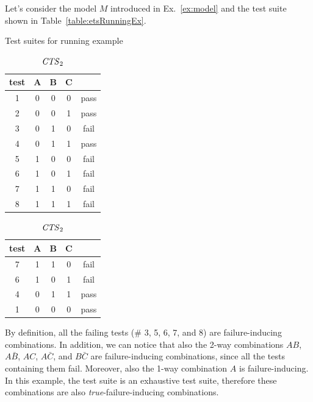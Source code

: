\begin{tikzborder}{\cite{Gargantini16:validation}}
\begin{tikzborder}{\cite{gargantini_combinatorial_2017}}
\begin{tikzborder}{\cite{garn2019}}
\begin{tikzborder}{\cite{arcaini2019achieving}}
\begin{example}\label{ex:fic}
\begin{tikzborder}{}
		Let's consider the model $M$ introduced in Ex.~\ref{ex:model} and the test suite shown in Table~\ref{table:etsRunningEx}.
\end{tikzborder}
\begin{table}[!htb]
		\caption{Test suites for running example}
		\centering
		\begin{subtable}[t]{.4\columnwidth}
			\caption{\ets}
			\label{table:etsRunningEx}
			\begin{tabular}{c|ccc|c}
				\toprule
				test &A & B & C & \result\\
				\midrule
				1& 0 & 0 & 0 & pass \\
				2& 0 & 0 & 1 & pass \\
				3& 0 & 1 & 0 & fail\\
				4& 0 & 1 & 1 & pass\\
				5& 1 & 0 & 0 & fail\\
				6& 1 & 0 & 1 & fail\\
				7& 1 & 1 & 0 & fail\\
				8& 1 & 1 & 1 & fail\\
				\bottomrule
			\end{tabular}
		\end{subtable}%
		\begin{subtable}[t]{.4\columnwidth}
			\centering
			\caption{$\mathit{CTS}_2$}
			\label{table:ctsRunningEx}
			\begin{tabular}{c|ccc|c}
				\toprule
				test &A & B & C & \result \\
				\midrule
				7 & 1 & 1 & 0 & fail\\
				6 & 1 & 0 & 1 & fail\\
				4 & 0 & 1 & 1 & pass\\
				1 & 0 & 0 & 0 & pass\\
				\bottomrule
			\end{tabular}
		\end{subtable} 
	\end{table}
\begin{tikzborder}{}
	By definition, all the failing tests (\# 3, 5, 6, 7, and 8) are failure-inducing combinations. In addition, we can notice that also the 2-way combinations $AB$, $A\bar{B}$, $AC$, $A\bar{C}$, and $B\bar{C}$ are failure-inducing combinations, since all the tests containing them fail. Moreover, also the 1-way combination $A$ is failure-inducing. In this example, the test suite is an exhaustive test suite, therefore these combinations are also \textit{true}-failure-inducing combinations.
\end{tikzborder}
\end{example}


\end{tikzborder}
\end{tikzborder}
\end{tikzborder}
\end{tikzborder}
